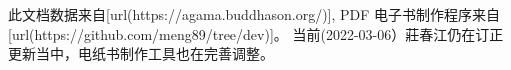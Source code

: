 此文档数据来自[url(https://agama.buddhason.org/)],
PDF 电子书制作程序来自[url(https://github.com/meng89/tree/dev)]。
当前(2022-03-06）莊春江仍在订正更新当中，电纸书制作工具也在完善调整。